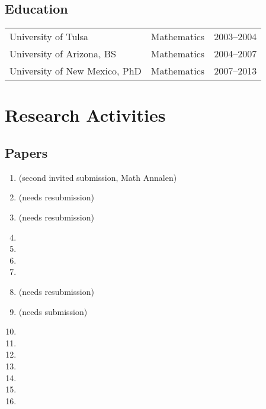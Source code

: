 \documentclass[a4paper,10pt]{article}
\begin{document}
 \subsection*{Education}
 \begin{flushleft}
\begin{tabular}{p{2in} p{1in}p{1in}}
University of Tulsa & Mathematics & 2003--2004 \\
University of Arizona, BS & Mathematics & 2004--2007\\
University of New Mexico, PhD &  Mathematics & 2007--2013
 \end{tabular}
 \end{flushleft}

\iffalse 
\subsection*{Research Interests}
Broad:  Algebraic Geometry, Differential Algebra, Number Theory, Applied Model Theory  \\
Specific: Deformation Theory, Diophantine Geometry, Differential Algebra and Witt vectors.
\fi 

\section*{Research Activities}

\subsection*{Papers}
\begin{enumerate}
\item {} (second invited submission, Math Annalen)
\item {}	(needs resubmission) 
\item {} (needs resubmission)
\item  {}
\item  {} 
 \item {}
 \item {}
 \item  {} (needs resubmission)
 \item  {} (needs submission)
 \item {}
 \item {}
 \item {}
  \item {}
\item {}
 \item {}
 \item {}
\end{enumerate}
\end{document}

